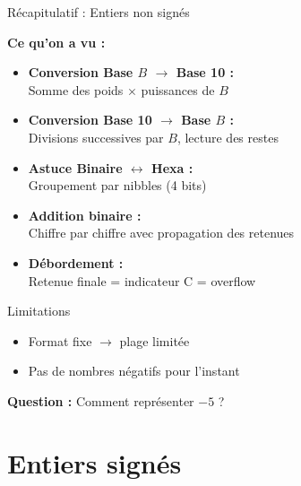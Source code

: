 \documentclass[aspectratio=1610]{beamer}
\begin{document}
\begin{frame}{Récapitulatif : Entiers non signés}

  \textbf{Ce qu'on a vu :}

  \begin{itemize}
    \item[\checkmark] \textbf{Conversion Base $B$ $\rightarrow$ Base 10 :} \\
          Somme des poids $\times$ puissances de $B$

    \item[\checkmark] \textbf{Conversion Base 10 $\rightarrow$ Base $B$ :} \\
          Divisions successives par $B$, lecture des restes

    \item[\checkmark] \textbf{Astuce Binaire $\leftrightarrow$ Hexa :} \\
          Groupement par nibbles (4 bits)

    \item[\checkmark] \textbf{Addition binaire :} \\
          Chiffre par chiffre avec propagation des retenues

    \item[\checkmark] \textbf{Débordement :} \\
          Retenue finale = indicateur C = overflow
  \end{itemize}

  \vspace{0.5em}

  \begin{block}{Limitations}
    \begin{itemize}
      \item Format fixe $\rightarrow$ plage limitée
      \item Pas de nombres négatifs pour l'instant
    \end{itemize}
    \textbf{Question :} Comment représenter $-5$ ?
  \end{block}

  \vspace{0.5em}


\end{frame}

\section{Entiers signés}
\end{document}
